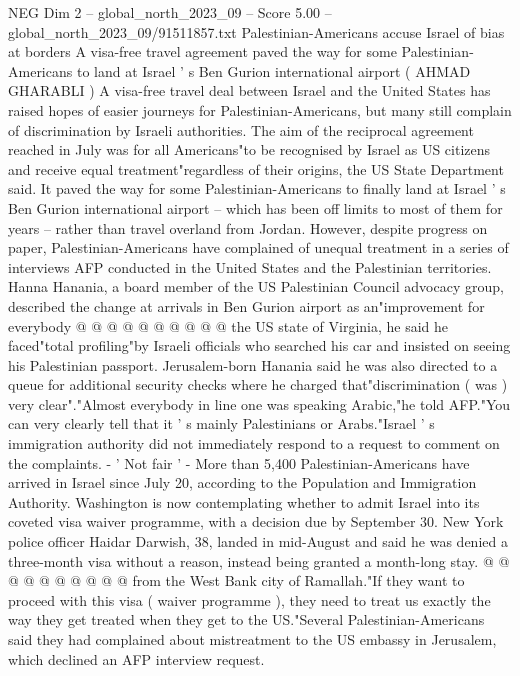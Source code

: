 \begin{textsample}{NEG Dim 2 – global\_north\_2023\_09 – Score 5.00 – global\_north\_2023\_09/91511857.txt}  \label{ex:f2_neg_078}
Palestinian-Americans accuse Israel of bias at borders A visa-free travel agreement paved the way for some Palestinian-Americans to land at Israel ' s Ben Gurion international airport ( AHMAD GHARABLI ) A visa-free travel deal between Israel and the United States has raised hopes of easier journeys for Palestinian-Americans, but many still complain of discrimination by Israeli authorities.
The aim of the reciprocal agreement reached in July was for all Americans"to be recognised by Israel as US citizens and receive equal treatment"regardless of their origins, the US State Department said.
It paved the way for some Palestinian-Americans to finally land at Israel ' s Ben Gurion international airport -- which has been off limits to most of them for years -- rather than travel overland from Jordan.
However, despite progress on paper, Palestinian-Americans have complained of unequal treatment in a series of interviews AFP conducted in the United States and the Palestinian territories.
Hanna Hanania, a board member of the US Palestinian Council advocacy group, described the change at arrivals in Ben Gurion airport as an"improvement for everybody @ @ @ @ @ @ @ @ @ @ the US state of Virginia, he said he faced"total profiling"by Israeli officials who searched his car and insisted on seeing his Palestinian passport.
Jerusalem-born Hanania said he was also directed to a queue for additional security checks where he charged that"discrimination ( was ) very clear"."Almost everybody in line one was speaking Arabic,"he told AFP."You can very clearly tell that it ' s mainly Palestinians or Arabs."Israel ' s immigration authority did not immediately respond to a request to comment on the complaints. - ' Not fair ' - More than 5,400 Palestinian-Americans have arrived in Israel since July 20, according to the Population and Immigration Authority.
Washington is now contemplating whether to admit Israel into its coveted visa waiver programme, with a decision due by September 30.
New York police officer Haidar Darwish, 38, landed in mid-August and said he was denied a three-month visa without a reason, instead being granted a month-long stay. @ @ @ @ @ @ @ @ @ @ from the West Bank city of Ramallah."If they want to proceed with this visa ( waiver programme ), they need to treat us exactly the way they get treated when they get to the US."Several Palestinian-Americans said they had complained about mistreatment to the US embassy in Jerusalem, which declined an AFP interview request.

\end{textsample}

